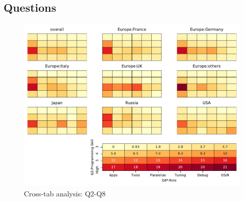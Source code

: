 
\subsection{Questions}


\begin{figure}
\begin{center}
\includegraphics[width=12cm]{../pdfs/Q2-Q8.pdf}
\caption{Cross-tab analysis: Q2-Q8}
\label{fig:Q2-Q8}
\end{center}
\end{figure}
